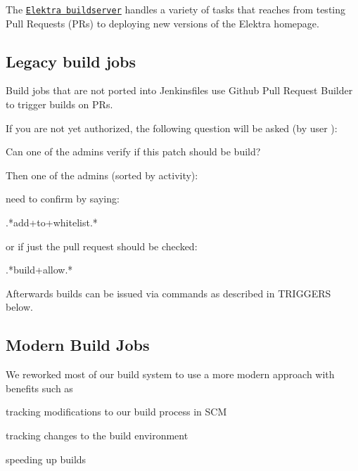 The \href{https://build.libelektra.org/}{\tt Elektra buildserver} handles a variety of tasks that reaches from testing Pull Requests (P\+Rs) to deploying new versions of the Elektra homepage.

\subsection*{Legacy build jobs}

Build jobs that are not ported into Jenkinsfiles use {\ttfamily Github Pull Request Builder} to trigger builds on PR\textquotesingle{}s.

If you are not yet authorized, the following question will be asked (by user )\+: \begin{DoxyVerb}Can one of the admins verify if this patch should be build?
\end{DoxyVerb}


Then one of the admins (sorted by activity)\+:


\begin{DoxyItemize}
\item 
\item 
\item 
\item 
\item 
\item 
\end{DoxyItemize}

need to confirm by saying\+: \begin{DoxyVerb}.*add\W+to\W+whitelist.*
\end{DoxyVerb}


or if just the pull request should be checked\+: \begin{DoxyVerb}.*build\W+allow.*
\end{DoxyVerb}


Afterwards builds can be issued via commands as described in {\ttfamily T\+R\+I\+G\+G\+E\+RS} below.

\subsection*{Modern Build Jobs}

We reworked most of our build system to use a more modern approach with benefits such as


\begin{DoxyItemize}
\item tracking modifications to our build process in S\+CM
\item tracking changes to the build environment
\item speeding up builds
\end{DoxyItemize}

